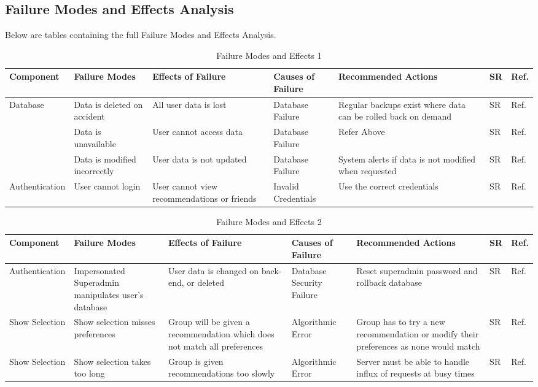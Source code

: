 \documentclass[12pt]{article}
\begin{document}
\begin{landscape}
\newpage
\section{Failure Modes and Effects Analysis}
Below are tables containing the full Failure Modes and Effects Analysis.
\begin{table}[hp]
	\caption{Failure Modes and Effects 1} \label{TblFMEA1}
	\begin{tabularx}{\linewidth}{| l | X X l X l l |}
		\hline
		Component & Failure Modes & Effects of Failure & Causes of Failure & Recommended Actions & SR & Ref. \\
		\hline
		Database & Data is deleted on accident & All user data is lost & Database Failure & Regular backups exist where data can be rolled back on demand & SR & Ref. \\
		\hdashline
		~ & Data is unavailable & User cannot access data & Database Failure & Refer Above & SR & Ref. \\
		\hdashline
		~ & Data is modified incorrectly & User data is not updated & Database Failure & System alerts if data is not modified when requested & SR & Ref. \\
		\hline
		Authentication & User cannot login & User cannot view recommendations or friends & Invalid Credentials & Use the correct credentials & SR & Ref. \\
		\hline
		\end{tabularx}
\end{table}
\newpage
\begin{table}[hp]
	\caption{Failure Modes and Effects 2} \label{TblFMEA2}
	\begin{tabularx}{\linewidth}{| l | X X l X l l |}
		\hline
		Component & Failure Modes & Effects of Failure & Causes of Failure & Recommended Actions & SR & Ref. \\
		\hline
		Authentication & Impersonated Superadmin manipulates user's database & User data is changed on back-end, or deleted & Database Security Failure & Reset superadmin password and rollback database & SR & Ref. \\
		\hline
		Show Selection & Show selection misses preferences & Group will be given a recommendation which does not match all preferences & Algorithmic Error & Group has to try a new recommendation or modify their preferences as none would match & SR & Ref. \\
		\hdashline
		Show Selection & Show selection takes too long & Group is given recommendations too slowly & Algorithmic Error & Server must be able to handle influx of requests at busy times & SR & Ref. \\

\end{tabularx}
\end{table}
\end{landscape}
\end{document}
